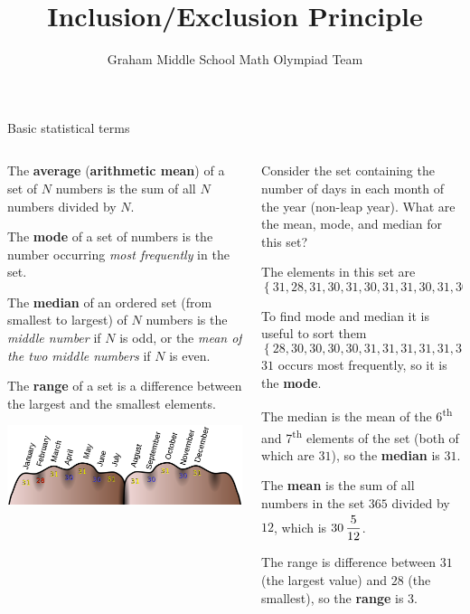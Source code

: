 \documentclass[9pt,aspectratio=169]{beamer}
\title{Inclusion/Exclusion Principle}
\subtitle[Graham Middle School]{Graham Middle School Math Olympiad Team}
\begin{document}
\maketitle

\begin{frame}{Basic statistical terms}
  \begin{columns}[T]
    \begin{column}{0.5\textwidth}
      \begin{definition}
        The \textbf{average} (\textbf{arithmetic mean}) of a set of $N$ numbers is the sum of all $N$ numbers divided by $N$.\medskip
        
        The \textbf{mode} of a set of numbers is the number occurring \emph{most frequently} in the set.\medskip

        The \textbf{median} of an ordered set (from smallest to largest) of $N$ numbers is the \emph{middle number} if $N$ is odd, or the \emph{mean of the two middle numbers} if $N$ is even. \medskip

        The \textbf{range} of a set is a difference between the largest and the smallest elements.
      \end{definition}
      \vspace*{0.5em}
      \includegraphics[width=\textwidth]{08 - Inclusion Exclusion Principle/hands.png}
    \end{column}
    \begin{column}{0.5\textwidth}
      Consider the set containing the number of days in each month of the year (non-leap year).  What are the mean, mode, and median for this set?

      The elements in this set are 
      \[ \left\{31, 28, 31, 30, 31, 30, 31, 31, 30, 31, 30, 31\right\}.\]
      
      To find mode and median it is useful to sort them
      \[ \left\{28, 30, 30, 30, 30, 31, 31, 31, 31, 31, 31, 31\right\}. \]
      $31$ occurs most frequently, so it is the \textbf{mode}. 
      
      The median is the mean of the 6\textsuperscript{th} and 7\textsuperscript{th} elements of the set (both of which are $31$), so the \textbf{median} is $31$.
      
      The \textbf{mean} is the sum of all numbers in the set $365$ divided by $12$, which is $30\, \dfrac{5\vphantom{5^5}}{12}$.\smallskip

      The range is difference between $31$ (the largest value) and $28$ (the smallest), so the \textbf{range} is $3$.
    \end{column}
  \end{columns}
\end{frame}
\end{document}
